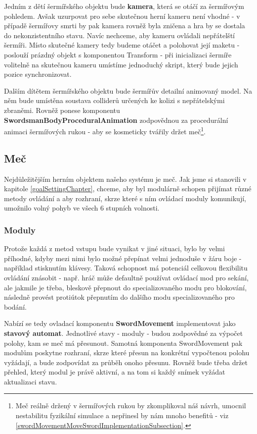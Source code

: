 Jedním z dětí šermířského objektu bude \textbf{kamera}, která se otáčí za šermířovým pohledem. Avšak uzurpovat pro sebe skutečnou herní kameru není vhodné - v případě šermířovy smrti by pak kamera rovněž byla zničena a hra by se dostala do nekonzistentního stavu. Navíc nechceme, aby kameru ovládali nepřátelští šermíři. Místo skutečné kamery tedy budeme otáčet a polohovat její maketu - poslouží prázdný objekt s komponentou Transform - při inicializaci šermíře volitelně na skutečnou kameru umístíme jednoduchý skript, který bude jejich pozice synchronizovat.

Dalším dítětem šermířského objektu bude šermířův detailní animovaný model. Na něm bude umístěna soustava colliderů určených ke kolizi s nepřátelskými zbraněmi. Rovněž ponese komponentu \textbf{SwordsmanBodyProceduralAnimation} zodpovědnou za procedurální animaci šermířových rukou - aby se kosmeticky tvářily držet meč\footnote{Meč reálně držený v šermířových rukou by zkomplikoval náš návrh, umocnil nestabilitu fyzikální simulace a nepřinesl by nám mnoho benefitů - viz \ref{swordMovementMoveSwordImplementationSubsection}.}.


\subsection{Meč} 

Nejdůležitějším herním objektem našeho systému je meč. Jak jsme si stanovili v kapitole \ref{goalSettingChapter}, chceme, aby byl modulárně schopen přijímat různé metody ovládání a aby rozhraní, skrze které s ním ovládací moduly komunikují, umožnilo volný pohyb ve všech 6 stupních volnosti.

\subsubsection*{Moduly}

Protože každá z metod vstupu bude vynikat v jiné situaci, bylo by velmi příhodné, kdyby mezi nimi bylo možné přepínat velmi jednoduše v žáru boje - například stisknutím klávesy. Taková schopnost má potenciál celkovou flexibilitu ovládání znásobit - např. hráč může defaultně používat ovládací mod pro sekání, ale jakmile je třeba, bleskově přepnout do specializovaného modu pro blokování, následně provést protiútok přepnutím do dalšího modu specializovaného pro bodání. 

Nabízí se tedy ovladací komponentu \textbf{SwordMovement} implementovat jako \textbf{stavový automat}. Jednotlivé stavy - moduly - budou zodpovědné za výpočet polohy, kam se meč má přesunout. Samotná komponenta SwordMovement pak modulům poskytne rozhraní, skrze které přesun na konkrétní vypočtenou polohu vyžádají, a bude zodpovídat za průběh onoho přesunu. Rovněž bude třeba držet přehled, který modul je právě aktivní, a na tom si každý snímek vyžádat aktualizaci stavu.

